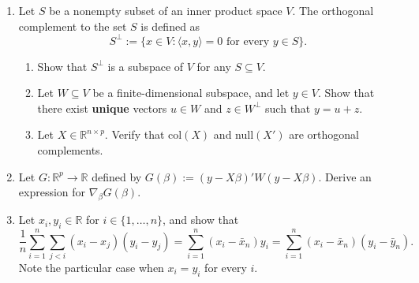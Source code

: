 \documentclass[11pt]{article}
\begin{document}
\begin{enumerate}
\item Let $S$ be a nonempty subset of an inner product space $V$.  The orthogonal complement to the set $S$ is defined as
\[
S^{\perp} := \{x \in V : \langle x,y\rangle = 0 \text{ for every } y \in S\}.
\]
\begin{enumerate}
\item Show that $S^{\perp}$ is a subspace of $V$ for any $S \subseteq V$.
\item Let $W \subseteq V$ be a finite-dimensional subspace, and let $y \in V$.  Show that there exist \textbf{unique} vectors $u \in W$ and $z \in W^{\perp}$ such that $y = u + z$.
\item Let $X \in \mathbb{R}^{n\times p}$.  Verify that col$(X)$ and null$(X')$ are orthogonal complements.
\end{enumerate}

\item Let $G : \mathbb{R}^{p} \to \mathbb{R}$ defined by $G(\beta) := (y - X\beta)'W(y - X\beta)$.  Derive an expression for $\nabla_{\beta}G(\beta)$.

\item Let $x_{i},y_{i} \in \mathbb{R}$ for $i \in \{1,\dots,n\}$, and show that
\[
\frac{1}{n}\sum_{i=1}^{n}\sum_{j<i}(x_{i} - x_{j})(y_{i} - y_{j}) = \sum_{i=1}^{n}(x_{i} - \bar{x}_{n})y_{i} = \sum_{i=1}^{n}(x_{i} - \bar{x}_{n})(y_{i} - \bar{y}_{n}).
\]
Note the particular case when $x_{i} = y_{i}$ for every $i$.


\end{enumerate}
\end{document}
